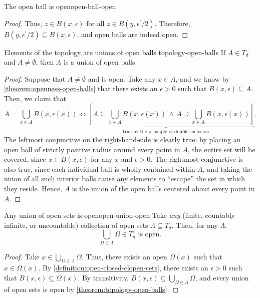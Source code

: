 \documentclass{article}
\numberwithin{equation}{section}
\numberwithin{figure}{section}
\begin{document}
\begin{theorem}{The open ball is open}{open-ball-open}
\begin{proof}
        Thus, $ z \in B(x, \epsilon) $ for all $ z \in B(y, \epsilon^\prime/2)
        $. Therefore, $ B(y, \epsilon^\prime/2) \subseteq B(x, \epsilon) $, and
        open balls are indeed open.
    \end{proof}
\end{theorem}
\begin{theorem}{Elements of the topology are unions of open balls}
        {topology-open-balls}
    If $ A \in T_d $ and $ A \neq \emptyset $, then $ A $ is a union of open
    balls.
    \begin{proof}
        Suppose that $ A \neq \emptyset $ and is open. Take any $ x \in A $, and
        we know by \cref{theorem:openness-open-balls} that there exists an $
        \epsilon > 0 $ such that $ B(x, \epsilon) \subseteq A $. Then, we claim
        that
        \begin{equation}
            A = \bigcup_{x \in A} B\left(x, \epsilon(x)\right)
            \underbrace{\iff \left[
                A \subseteq \bigcup_{x \in A} B\left(x, \epsilon(x)\right)
                    \,\land\, A \supseteq \bigcup_{x \in A} B\left(x,
                    \epsilon(x)\right)
                \right]}_{\text{true by the principle of double-inclusion}}.
        \end{equation}
        The leftmost conjunctive on the right-hand-side is clearly true: by
        placing an open ball of strictly positive radius around every point in $
        A $, the entire set will be covered, since $ x \in B(x, \epsilon) $ for
        any $ x $ and $ \epsilon > 0 $. The rightmost conjunctive is also true,
        since each individual ball is wholly contained within $ A $, and taking
        the union of all such interior balls cause any elements to ``escape''
        the set in which they reside. Hence, $ A $ is the union of the open
        balls centered about every point in $ A $.
    \end{proof}
\end{theorem}
\begin{theorem}{Any union of open sets is open}{open-union-open}
    Take \emph{any} (finite, countably infinite, or uncountable) collection of
    open sets $ \Lambda \subseteq T_d $. Then, for any $ \Lambda $,
    \begin{equation}
        \bigcup_{\Omega \in \Lambda} \Omega \in T_d \text { is open.}
    \end{equation}
    \begin{proof}
        Take $ x \in \bigcup_{\Omega \in \Lambda} \Omega $. Thus, there exists
        an open $ \Omega(x) $ such that $ x \in \Omega(x) $. By
        \cref{definition:open-closed-clopen-sets}, there exists an $ \epsilon >
        0 $ such that $ B(x, \epsilon) \subseteq \Omega(x) $. By transitivity,
        $ B(x, \epsilon) \subseteq \bigcup_{\Omega \in \Lambda} \Omega $, and
        every union of open sets is open by \cref{theorem:topology-open-balls}.
    \end{proof}
\end{theorem}
\end{document}
